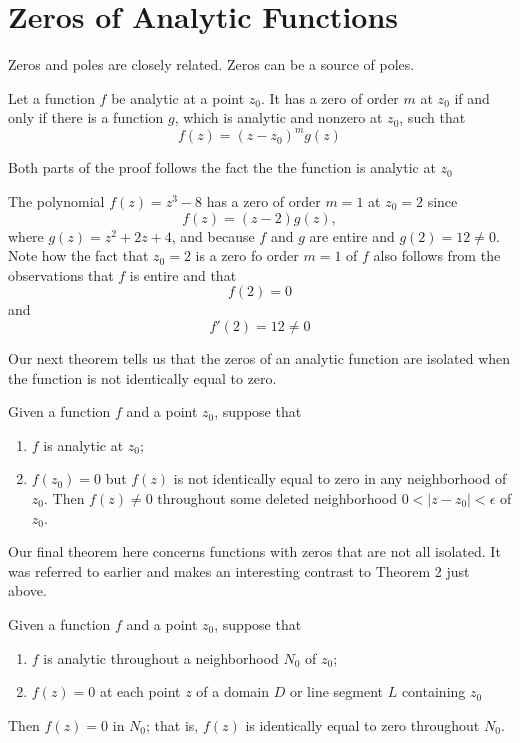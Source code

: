 \section{Zeros of Analytic Functions}
Zeros and poles are closely related. Zeros can be a source of poles. 
\begin{theorem}
	Let a function $ f $ be analytic at a point $ z_0 $. It has a zero of order $ m $ at $ z_0 $ if and only if there is a function $ g $, which is analytic and nonzero at $ z_0 $, such that \[ f(z) = (z-z_0)^m g(z) \] \indent 
\end{theorem}
	Both parts of the proof follows the fact the the function is analytic at $ z_0 $ 
\begin{example}
	The polynomial $ f(z) = z^3 - 8 $ has a zero of order $ m = 1 $ at $ z_0 = 2 $ since \[ f(z) = (z-2)g(z), \] where $ g(z) = z^2 + 2z + 4 $, and because $ f $ and $ g $ are entire and $ g(2) = 12 \neq 0 $. Note how the fact that $ z_0 = 2 $ is a zero fo order $ m = 1 $ of $ f $ also follows from the observations that $ f $ is entire and that \[ f(2) = 0\]and \[ f'(2) = 12 \neq 0 \] 
\end{example}
		\indent Our next theorem tells us that the zeros of an analytic function are isolated when the function is not identically equal to zero. 
\begin{theorem}
	Given a function $ f $ and a point $ z_0 $, suppose that 
	\begin{enumerate}
		\item $ f $ is analytic at $ z_0 $; 
		\item $ f(z_0) = 0$ but $ f(z) $ is not identically equal to zero in any neighborhood of $ z_0 $. Then $ f(z) \neq 0 $ throughout some deleted neighborhood $ 0 < |z-z_0|< \epsilon $ of $ z_0 $.  
	\end{enumerate}
\end{theorem}
Our final theorem here concerns functions with zeros that are not all isolated.
It was referred to earlier and makes an interesting contrast to Theorem 2
just above.
\begin{theorem}
	Given a function $ f $ and a point $ z_0 $, suppose that 
	\begin{enumerate}
		\item $ f $ is analytic throughout a neighborhood $ N_0 $ of $ z_0 $; 
		\item $ f(z) = 0 $ at each point $ z $ of a domain $ D $ or line segment $ L $ containing $ z_0 $ 
	\end{enumerate}
	Then $ f(z) = 0 $ in $ N_0 $; that is, $ f(z) $ is identically equal to zero throughout $ N_0 $. 
\end{theorem}
